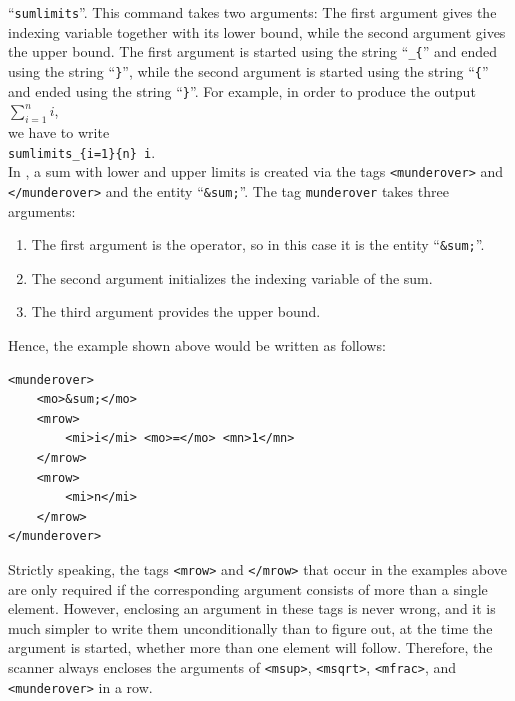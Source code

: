 \begin{enumerate}
      ``\texttt{sumlimits}''.  
      This command takes two arguments:  The first argument gives the indexing variable together
      with its lower bound, while the second argument gives the upper bound.  The first argument
      is started using the string ``\texttt{\_\{}'' and ended using the string ``\texttt{\}}'',
      while the second argument is started using the string ``\texttt{\{}'' and ended using the
      string ``\texttt{\}}''.  For example, in order to produce the output 
      \\[0.2cm]
      \hspace*{1.3cm}
      $\displaystyle\sum\limits_{i=1}^{n} i$,
      \\[0.2cm]
      we have to write
      \\[0.2cm]
      \hspace*{1.3cm}
      \texttt{sumlimits\_\{i=1\}\{n\} i}.
      \\[0.2cm]
      In , a sum with lower and upper limits is created via the tags
      \texttt{<munderover>} and \texttt{</munderover>} and the  entity ``\texttt{\&sum;}''.
      The tag \texttt{munderover} takes three arguments:
      \begin{enumerate}
      \item The first argument is the operator, so in this case it is the entity ``\texttt{\&sum;}''.
      \item The second argument initializes the indexing variable of the sum.
      \item The third argument provides the upper bound.
      \end{enumerate}
      Hence, the example shown above would be written as follows:
\begin{verbatim}
<munderover>
    <mo>&sum;</mo>
    <mrow>
        <mi>i</mi> <mo>=</mo> <mn>1</mn>
    </mrow>
    <mrow>
        <mi>n</mi>
    </mrow>
</munderover>
\end{verbatim}
\end{enumerate}

\noindent
Strictly speaking, the tags \texttt{<mrow>} and \texttt{</mrow>} that occur in the examples above are only
required if the corresponding argument consists of more than a single element.  However, enclosing an argument
in these tags is never wrong, and it is much simpler to write them unconditionally than to figure out, at the
time the argument is started, whether more than one element will follow.  Therefore, the scanner always encloses
the arguments of \texttt{<msup>}, \texttt{<msqrt>}, \texttt{<mfrac>}, and \texttt{<munderover>} in a row.

